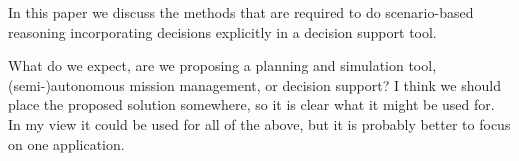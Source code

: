 \documentclass[conference]{IEEEtran}
\begin{document}
In this paper we discuss the methods that are required to do scenario-based reasoning incorporating decisions explicitly in a decision support tool.

{\red What do we expect, are we proposing a planning and simulation tool, (semi-)autonomous mission management, or decision support? I think we should place the proposed solution somewhere, so it is clear what it might be used for. In my view it could be used for all of the above, but it is probably better to focus on one application.}






\end{document}
